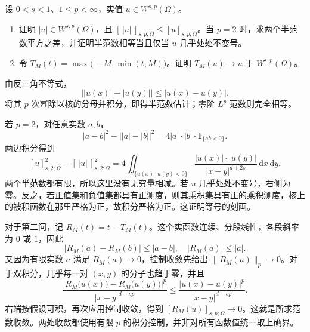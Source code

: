 \begin{exercise}\label{b1:ex:23-fractional-modulus-truncation}
设 \(0<s<1\)、\(1\le p<\infty\)，实值 \(u\in W^{s,p}(\Omega)\)。
\begin{enumerate}
\item\label{b1:item:23-fractional-modulus}
证明 \(|u|\in W^{s,p}(\Omega)\)，且 \([\,|u|\,]_{s,p;\Omega}\le[u]_{s,p;\Omega}\)。当 \(p=2\) 时，求两个半范数平方之差，并证明半范数相等当且仅当 \(u\) 几乎处处不变号。
\item\label{b1:item:23-fractional-truncation}
令 \(T_M(t)=\max\bigl(-M,\min(t,M)\bigr)\)。证明 \(T_M(u)\to u\) 于 \(W^{s,p}(\Omega)\)。
\end{enumerate}
\end{exercise}
\begin{solution}
由反三角不等式，
\[
 \bigl||u(x)|-|u(y)|\bigr|\le|u(x)-u(y)|.
\]
将其 \(p\) 次幂除以核的分母并积分，即得半范数估计；零阶 \(L^p\) 范数则完全相等。

若 \(p=2\)，对任意实数 \(a,b\)，
\[
 |a-b|^2-\bigl||a|-|b|\bigr|^2
 =4|a|\cdot|b|\cdot\mathbf1_{\{ab<0\}}.
\]
两边积分得到
\[
 [u]_{s,2;\Omega}^2-[\,|u|\,]_{s,2;\Omega}^2
 =4\iint_{\{u(x)\cdot u(y)<0\}}
       \frac{|u(x)|\cdot|u(y)|}{|x-y|^{d+2s}}\,\mathrm dx\,\mathrm dy.
\]
两个半范数都有限，所以这里没有无穷量相减。若 \(u\) 几乎处处不变号，右侧为零。反之，若正值集和负值集都具有正测度，则其乘积集具有正的乘积测度，核上的被积函数在那里严格为正，故积分严格为正。这证明等号的刻画。

对于第二问，记 \(R_M(t)=t-T_M(t)\)。这个实函数连续、分段线性，各段斜率为 \(0\) 或 \(1\)，因此
\[
 |R_M(a)-R_M(b)|\le|a-b|,\quad |R_M(a)|\le|a|.
\]
又因为有限实数 \(a\) 满足 \(R_M(a)\to0\)，控制收敛先给出
\(\|R_M(u)\|_p\to0\)。对于双积分，几乎每一对 \((x,y)\) 的分子也趋于零，并且
\[
 \frac{\bigl|R_M\bigl(u(x)\bigr)-R_M\bigl(u(y)\bigr)\bigr|^p}{|x-y|^{d+sp}}
 \le\frac{|u(x)-u(y)|^p}{|x-y|^{d+sp}}.
\]
右端按假设可积，再次应用控制收敛，得到
\([R_M(u)]_{s,p;\Omega}\to0\)。这就是所求范数收敛。两处收敛都使用有限 \(p\) 的积分控制，并非对所有函数值统一取上确界。
\end{solution}

